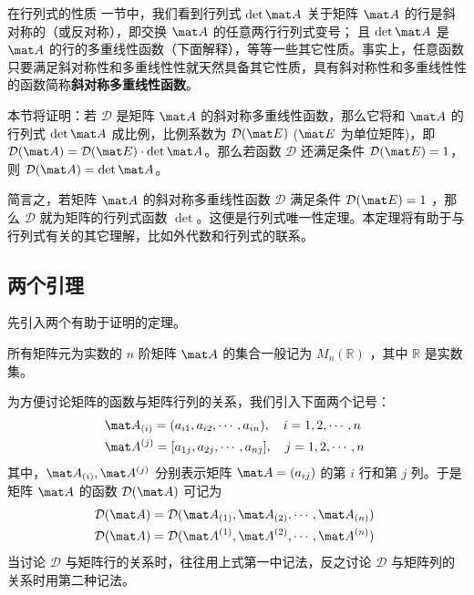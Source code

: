 
在行列式的性质 一节中，我们看到行列式 $\det \mat A$ 关于矩阵 $\mat A$ 的行是斜对称的（或反对称），即交换 $\mat A$ 的任意两行行列式变号； 且 $\det \mat A$ 是 $\mat A$ 的行的多重线性函数（下面解释），等等一些其它性质。事实上，任意函数只要满足斜对称性和多重线性性就天然具备其它性质，具有斜对称性和多重线性性的函数简称\textbf{斜对称多重线性函数}。

本节将证明：若 $\mathcal D$ 是矩阵 $\mat A$ 的斜对称多重线性函数，那么它将和 $\mat A$ 的行列式 $\det \mat A$ 成比例，比例系数为 $\mathcal D(\mat E)$ ($\mat E$ 为单位矩阵)，即 $\mathcal D(\mat A)=\mathcal D(\mat E)\cdot \det \mat A$。那么若函数 $\mathcal D$ 还满足条件 $\mathcal D(\mat E)=1$，则 $\mathcal D(\mat A)=\det\mat A$。

简言之，若矩阵 $\mat A$ 的斜对称多重线性函数 $\mathcal D$ 满足条件 $\mathcal D(\mat E)=1$ ，那么 $\mathcal D$ 就为矩阵的行列式函数 $\det$。这便是行列式唯一性定理。本定理将有助于与行列式有关的其它理解，比如外代数和行列式的联系。

\subsection{两个引理}

先引入两个有助于证明的定理。

所有矩阵元为实数的 $n$ 阶矩阵 $\mat A$ 的集合一般记为 $M_n(\mathbb R)$ ，其中 $\mathbb R$ 是实数集。

为方便讨论矩阵的函数与矩阵行列的关系，我们引入下面两个记号：
\begin{equation}
\begin{aligned}
&\mat A_{(i)}=(a_{i1},a_{i2},\cdots,a_{in}),\quad i=1,2,\cdots, n\\
&\mat A^{(j)}=[a_{1j},a_{2j},\cdots,a_{nj}],\quad j=1,2,\cdots, n
\end{aligned}~
\end{equation}
其中，$\mat A_{(i)},\mat A^{(j)}$ 分别表示矩阵 $\mat A=(a_{ij})$ 的第 $i$ 行和第 $j$ 列。于是矩阵 $\mat A$ 的函数 $\mathcal D(\mat A)$ 可记为 
\begin{equation}
\begin{aligned}
&\mathcal D(\mat A)=\mathcal D(\mat A_{(1)},\mat A_{(2)},\cdots,\mat A_{(n)})\\
&\mathcal D(\mat A)=\mathcal D(\mat A^{(1)},\mat A^{(2)},\cdots,\mat A^{(n)})\\
\end{aligned}~
\end{equation}
当讨论 $\mathcal D$ 与矩阵行的关系时，往往用上式第一中记法，反之讨论 $\mathcal D$ 与矩阵列的关系时用第二种记法。

